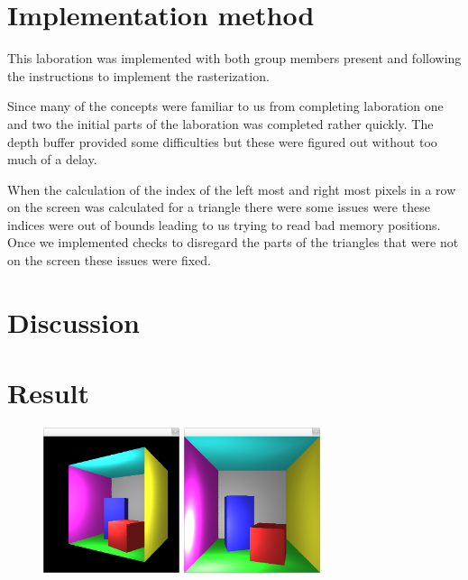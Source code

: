 \documentclass[a4paper]{article}
\begin{document}
\section{Implementation method}

This laboration was implemented with both group members present and following
the instructions to implement the rasterization.

Since many of the concepts were familiar to us from completing laboration one
and two the initial parts of the laboration was completed rather quickly. The
depth buffer provided some difficulties but these were figured out without too
much of a delay.

When the calculation of the index of the left most and right most pixels in a
row on the screen was calculated for a triangle there were some issues were 
these indices were out of bounds leading to us trying to read bad memory
positions. Once we implemented checks to disregard the parts of the triangles 
that were not on the screen these issues were fixed.
\section{Discussion}
\section{Result}
\begin{figure}[H]
    \centering
    \begin{minipage}{.5\textwidth}
        \centering
        \includegraphics[width=4cm]{ani0.png}
    \end{minipage}%
    \begin{minipage}{.5\textwidth}
        \centering
        \includegraphics[width=4cm]{light0.png}
    \end{minipage}
\end{figure}
\end{document}
